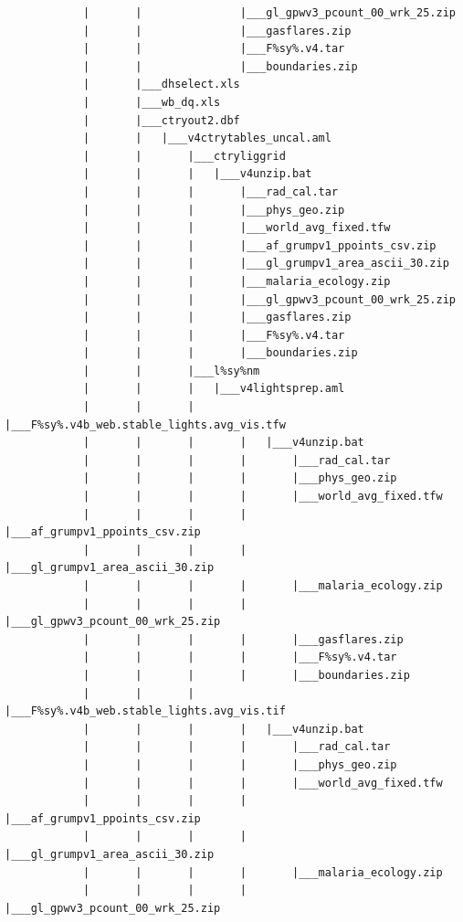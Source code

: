 \documentclass[
]{book}
\begin{document}
\begin{verbatim}
            |       |               |___gl_gpwv3_pcount_00_wrk_25.zip
            |       |               |___gasflares.zip
            |       |               |___F%sy%.v4.tar
            |       |               |___boundaries.zip
            |       |___dhselect.xls
            |       |___wb_dq.xls
            |       |___ctryout2.dbf
            |       |   |___v4ctrytables_uncal.aml
            |       |       |___ctryliggrid
            |       |       |   |___v4unzip.bat
            |       |       |       |___rad_cal.tar
            |       |       |       |___phys_geo.zip
            |       |       |       |___world_avg_fixed.tfw
            |       |       |       |___af_grumpv1_ppoints_csv.zip
            |       |       |       |___gl_grumpv1_area_ascii_30.zip
            |       |       |       |___malaria_ecology.zip
            |       |       |       |___gl_gpwv3_pcount_00_wrk_25.zip
            |       |       |       |___gasflares.zip
            |       |       |       |___F%sy%.v4.tar
            |       |       |       |___boundaries.zip
            |       |       |___l%sy%nm
            |       |       |   |___v4lightsprep.aml
            |       |       |       |___F%sy%.v4b_web.stable_lights.avg_vis.tfw
            |       |       |       |   |___v4unzip.bat
            |       |       |       |       |___rad_cal.tar
            |       |       |       |       |___phys_geo.zip
            |       |       |       |       |___world_avg_fixed.tfw
            |       |       |       |       |___af_grumpv1_ppoints_csv.zip
            |       |       |       |       |___gl_grumpv1_area_ascii_30.zip
            |       |       |       |       |___malaria_ecology.zip
            |       |       |       |       |___gl_gpwv3_pcount_00_wrk_25.zip
            |       |       |       |       |___gasflares.zip
            |       |       |       |       |___F%sy%.v4.tar
            |       |       |       |       |___boundaries.zip
            |       |       |       |___F%sy%.v4b_web.stable_lights.avg_vis.tif
            |       |       |       |   |___v4unzip.bat
            |       |       |       |       |___rad_cal.tar
            |       |       |       |       |___phys_geo.zip
            |       |       |       |       |___world_avg_fixed.tfw
            |       |       |       |       |___af_grumpv1_ppoints_csv.zip
            |       |       |       |       |___gl_grumpv1_area_ascii_30.zip
            |       |       |       |       |___malaria_ecology.zip
            |       |       |       |       |___gl_gpwv3_pcount_00_wrk_25.zip

\end{verbatim}
\end{document}
